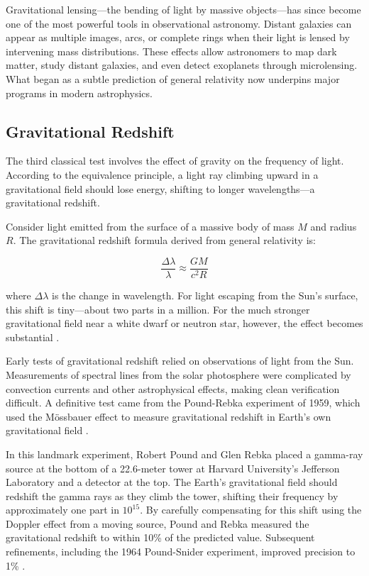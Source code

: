 \documentclass[12pt, a4paper]{article}
\begin{document}
	Gravitational lensing—the bending of light by massive objects—has since become one of the most powerful tools in observational astronomy. Distant galaxies can appear as multiple images, arcs, or complete rings when their light is lensed by intervening mass distributions. These effects allow astronomers to map dark matter, study distant galaxies, and even detect exoplanets through microlensing. What began as a subtle prediction of general relativity now underpins major programs in modern astrophysics.
	
	\subsection{Gravitational Redshift}
	The third classical test involves the effect of gravity on the frequency of light. According to the equivalence principle, a light ray climbing upward in a gravitational field should lose energy, shifting to longer wavelengths—a gravitational redshift.
	
	Consider light emitted from the surface of a massive body of mass \(M\) and radius \(R\). The gravitational redshift formula derived from general relativity is:
	
	\begin{equation}
		\frac{\Delta\lambda}{\lambda} \approx \frac{GM}{c^2 R}
		\label{eq:redshift}
	\end{equation}
	
	where \(\Delta\lambda\) is the change in wavelength. For light escaping from the Sun's surface, this shift is tiny—about two parts in a million. For the much stronger gravitational field near a white dwarf or neutron star, however, the effect becomes substantial \citep{carrollSpacetimeGeometryIntroduction2019}.
	
	Early tests of gravitational redshift relied on observations of light from the Sun. Measurements of spectral lines from the solar photosphere were complicated by convection currents and other astrophysical effects, making clean verification difficult. A definitive test came from the Pound-Rebka experiment of 1959, which used the Mössbauer effect to measure gravitational redshift in Earth's own gravitational field \citep{poundApparentWeightPhotons1960}.
	
	In this landmark experiment, Robert Pound and Glen Rebka placed a gamma-ray source at the bottom of a 22.6-meter tower at Harvard University's Jefferson Laboratory and a detector at the top. The Earth's gravitational field should redshift the gamma rays as they climb the tower, shifting their frequency by approximately one part in \(10^{15}\). By carefully compensating for this shift using the Doppler effect from a moving source, Pound and Rebka measured the gravitational redshift to within 10\% of the predicted value. Subsequent refinements, including the 1964 Pound-Snider experiment, improved precision to 1\% \citep{willConfrontationGeneralRelativity2014}.
	
\end{document}
